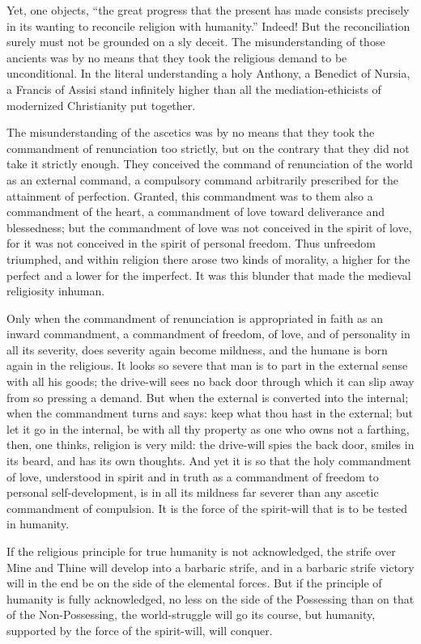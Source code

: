 \documentclass[12pt,a4paper,openany]{book}
\newcommand{\opage}[1]{\marginnote{\footnotesize\textit{[#1]}}}
\begin{document}
Yet, one objects, ``the great progress that the present
has made consists precisely in its wanting to reconcile religion
with humanity.'' Indeed! But the reconciliation surely must
not be grounded on a sly deceit. The misunderstanding
of those ancients was by no means that they took the religious
demand to be unconditional. In the literal understanding
a holy Anthony, a Benedict of Nursia,
a Francis of Assisi stand infinitely higher than all the
mediation-ethicists of modernized Christianity put together.

The misunderstanding of the ascetics was by no means that
they took the commandment of renunciation too strictly, but on the contrary that
they did not take it strictly enough. They conceived the command of
\setcounter{footnote}{0}%
\opage{79}renunciation of the world as an external command, a compulsory command
arbitrarily prescribed for the attainment of perfection. Granted,
this commandment was to them also a commandment of the heart, a commandment of love
toward deliverance and blessedness; but the commandment of
love was not conceived in the spirit of love, for it
was not conceived in the spirit of personal freedom. Thus
unfreedom triumphed, and within religion there arose two
kinds of morality, a higher for the perfect and a lower
for the imperfect. It was this blunder that made
the medieval religiosity inhuman.

Only when the commandment of renunciation is appropriated in faith
as an inward commandment, a commandment of freedom, of love, and of
personality in all its severity, does severity
again become mildness, and the humane is born again in the religious.
It looks so severe that man is to part in the external
sense with all his goods; the drive-will sees no
back door through which it can slip away from so pressing
a demand. But when the external is converted
into the internal; when the commandment turns and says: keep
what thou hast in the external; but let it go in the internal,
be with all thy property as one who owns not a farthing,
then, one thinks, religion is very mild: the drive-will spies
the back door, smiles in its beard, and has its own thoughts. And yet
it is so that the holy commandment of love, understood in spirit
and in truth as a commandment of freedom to personal self-development,
is in all its mildness far severer than any
ascetic commandment of compulsion. It is the force of the spirit-will
that is to be tested in humanity.

If the religious principle for true humanity
is not acknowledged, the strife over Mine and Thine will develop
into a barbaric strife, and in a barbaric strife victory
will in the end be on the side of the elemental forces. But if
the principle of humanity is fully acknowledged, no less
on the side of the Possessing than on that of the Non-Possessing,
the world-struggle will go its course, but humanity,
supported by the force of the spirit-will, will conquer.
\end{document}
